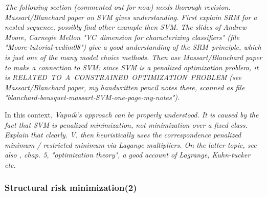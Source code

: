 \documentclass[11pt,twoside]{article}%
\theoremstyle{change}
\newenvironment{quote-env}{\begin{quote}\sffamily }{\end{quote}}
\newenvironment{mycomments-env}[1][Mycomments]{\textbf{#1.} \begin{quote-env} }{ \end{quote-env}  \ \rule{0.5em}{0.5em}}
\begin{document}
\begin{mycomments}%


\begin{mycomments-env}
\textit{The following section (commented out for now) needs thorough revision.
Massart/Blanchard paper on SVM gives understanding. First explain SRM for a
nested sequence, possibly find other example then SVM. The slides of Andrew
Moore, Carnegie Mellon "VC\ dimension for characterizing classifiers" (file
"Moore-tutorial-vcdim08") give a good understanding of the SRM\ principle,
which is just one of the many model choice methods. Then use Massart/Blanchard
paper to make a connection to SVM: since SVM is a penalized optimization
problem, it is RELATED\ TO\ A\ CONSTRAINED\ OPTIMIZATION\ PROBLEM (see
Massart/Blanchard paper, my handwritten pencil notes there, scanned as file
"blanchard-bousquet-massart-SVM-one-page-my-notes"). }

In this context, \textit{Vapnik's approach can be properly understood. It is
caused by the fact that SVM is penalized minimization, not minimization over a
fixed class. Explain that clearly. V. then heuristically uses the
correspondence penalized minimum / restricted minimum via Lagange multipliers.
On the latter topic, see also \cite{CST}, chap. 5, "optimization theory", a
good account of Lagrange, Kuhn-tucker etc. }
\end{mycomments-env}

\subsubsection{Structural risk minimization(2)}


\end{mycomments}
\end{document}
